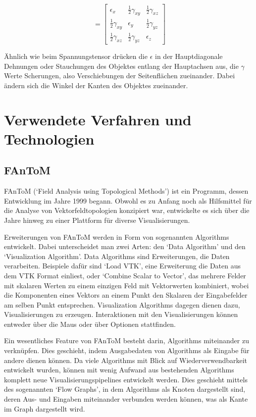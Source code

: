 \documentclass[a4paper,fontsize=12pt,toc=bib,halfparskip]{scrartcl}
\begin{document}
\begin{equation}
	\   =  
	\begin{bmatrix}
		\epsilon_x & \frac{1}{2}\gamma_{xy} & \frac{1}{2}\gamma_{xz}\\
		\frac{1}{2}\gamma_{xy} & \epsilon_y & \frac{1}{2}\gamma_{yz}\\
		\frac{1}{2}\gamma_{xz} & \frac{1}{2}\gamma_{yz} & \epsilon_z
	\end{bmatrix}
\end{equation}

\"Ahnlich wie beim Spannungstensor dr\"ucken die $\epsilon$ in der Hauptdiagonale Dehnungen oder Stauchungen des Objektes entlang der Hauptachsen aus, die $\gamma$ Werte Scherungen, also Verschiebungen der Seitenfl\"achen zueinander. Dabei \"andern sich die Winkel der Kanten des Objektes zueinander.

\section{Verwendete Verfahren und Technologien}
\label{sec:Technologien}
\subsection{FAnToM}
FAnToM\cite{fantomWebsite}\cite{wiebel2009fantom} (`Field Analysis using Topological Methods') ist ein Programm, dessen Entwicklung im Jahre 1999 begann. Obwohl es zu Anfang noch als Hilfsmittel f\"ur die Analyse von Vektorfeldtopologien konzipiert war, entwickelte es sich \"uber die Jahre hinweg zu einer Plattform f\"ur diverse Visualisierungen.

Erweiterungen von FAnToM werden in Form von sogenannten Algorithms entwickelt. Dabei unterscheidet man zwei Arten: den `Data Algorithm' und den `Visualization Algorithm'. Data Algorithms sind Erweiterungen, die Daten verarbeiten. Beispiele daf\"ur sind `Load VTK', eine Erweiterung die Daten aus dem VTK Format einliest, oder `Combine Scalar to Vector', das mehrere Felder mit skalaren Werten zu einem einzigen Feld mit Vektorwerten kombiniert, wobei die Komponenten eines Vektors an einem Punkt den Skalaren der Eingabefelder am selben Punkt entsprechen.
Visualization Algorithms dagegen dienen dazu, Visualisierungen zu erzeugen. Interaktionen mit den Visualisierungen k\"onnen entweder \"uber die Maus oder \"uber Optionen stattfinden.

Ein wesentliches Feature von FAnToM besteht darin, Algorithms miteinander zu verkn\"upfen. Dies geschieht, indem Ausgabedaten von Algorithms als Eingabe f\"ur andere dienen k\"onnen. Da viele Algorithms mit Blick auf Wiederverwendbarkeit entwickelt wurden, k\"onnen mit wenig Aufwand aus bestehenden Algorithms komplett neue Visualisierungspipelines entwickelt werden. Dies geschieht mittels des sogenannten `Flow Graphs', in dem Algorithms als Knoten dargestellt sind, deren Aus- und Eingaben miteinander verbunden werden k\"onnen, was als Kante im Graph dargestellt wird.
\end{document}
